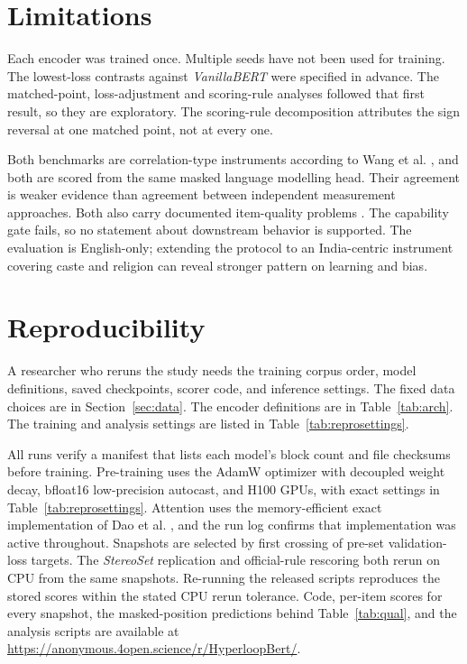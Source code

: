 \documentclass[sigconf,natbib=true,anonymous=true]{acmart}
\begin{document}
\section{Limitations}
\label{sec:limits}

Each encoder was trained once. Multiple seeds have not been used for training. The lowest-loss contrasts against \emph{VanillaBERT} were specified in advance. The matched-point, loss-adjustment and scoring-rule analyses followed that first
result, so they are exploratory. The scoring-rule decomposition attributes the sign reversal at one matched point, not at every one.

Both benchmarks are correlation-type instruments according to Wang et al. \citep{wang2025difference}, and both are scored from the same masked language modelling head. Their agreement is weaker evidence than agreement between independent measurement approaches. Both also carry documented item-quality
problems \citep{blodgett2021salmon}. The capability gate fails, so no statement
about downstream behavior is supported. The evaluation is English-only;
extending the protocol to an India-centric instrument covering caste and
religion \citep{khandelwal2023indianbhed} can reveal stronger pattern on learning and bias.

\section{Reproducibility}
\label{sec:repro}

A researcher who reruns the study needs the training corpus order, model
definitions, saved checkpoints, scorer code, and inference settings. The fixed
data choices are in Section~\ref{sec:data}. The encoder definitions are in
Table~\ref{tab:arch}. The training and analysis settings are listed in
Table~\ref{tab:reprosettings}.

All runs verify a manifest that lists each model's block count and file
checksums before training. Pre-training uses the AdamW optimizer with decoupled
weight decay, bfloat16 low-precision autocast, and H100 GPUs, with exact
settings in Table~\ref{tab:reprosettings}. Attention uses the memory-efficient
exact implementation of Dao et al. \citep{dao2022flashattention}, and the run log confirms
that implementation was active throughout. Snapshots are selected by first
crossing of pre-set validation-loss targets. The
\emph{StereoSet} replication and official-rule rescoring both rerun on CPU from
the same snapshots. Re-running the released scripts reproduces the stored scores within the stated CPU rerun tolerance.
Code, per-item scores for every snapshot, the masked-position predictions behind
Table~\ref{tab:qual}, and the analysis scripts are available at
\url{https://anonymous.4open.science/r/HyperloopBert/}.
\end{document}
